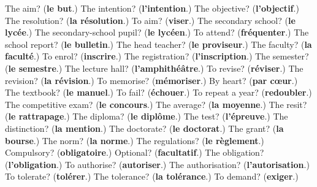 \begin{tcolorbox}[breakable,colback=teal!4,colframe=teal!35!black,title={Before you move on}]
The aim? (\textbf{le but}.) The intention? (\textbf{l'intention}.) The objective? (\textbf{l'objectif}.) The resolution? (\textbf{la résolution}.) To aim? (\textbf{viser}.) The secondary school? (\textbf{le lycée}.) The secondary-school pupil? (\textbf{le lycéen}.) To attend? (\textbf{fréquenter}.) The school report? (\textbf{le bulletin}.) The head teacher? (\textbf{le proviseur}.) The faculty? (\textbf{la faculté}.) To enrol? (\textbf{inscrire}.) The registration? (\textbf{l'inscription}.) The semester? (\textbf{le semestre}.) The lecture hall? (\textbf{l'amphithéâtre}.) To revise? (\textbf{réviser}.) The revision? (\textbf{la révision}.) To memorise? (\textbf{mémoriser}.) By heart? (\textbf{par cœur}.) The textbook? (\textbf{le manuel}.) To fail? (\textbf{échouer}.) To repeat a year? (\textbf{redoubler}.) The competitive exam? (\textbf{le concours}.) The average? (\textbf{la moyenne}.) The resit? (\textbf{le rattrapage}.) The diploma? (\textbf{le diplôme}.) The test? (\textbf{l'épreuve}.) The distinction? (\textbf{la mention}.) The doctorate? (\textbf{le doctorat}.) The grant? (\textbf{la bourse}.) The norm? (\textbf{la norme}.) The regulations? (\textbf{le règlement}.) Compulsory? (\textbf{obligatoire}.) Optional? (\textbf{facultatif}.) The obligation? (\textbf{l'obligation}.) To authorise? (\textbf{autoriser}.) The authorisation? (\textbf{l'autorisation}.) To tolerate? (\textbf{tolérer}.) The tolerance? (\textbf{la tolérance}.) To demand? (\textbf{exiger}.)
\end{tcolorbox}
